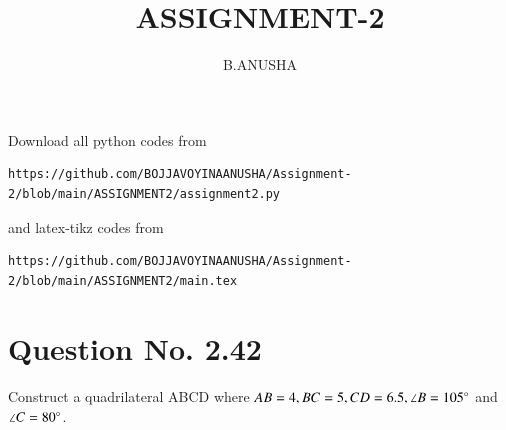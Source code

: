 \documentclass[journal,12pt,twocolumn]{IEEEtran}
\begin{document}
     \def\centbox#1{\makebox[0in]{#1}}
     \def\topbox#1{\raisebox{-\baselineskip}[0in][0in]{#1}}
     \def\midbox#1{\raisebox{-0.5\baselineskip}[0in][0in]{#1}}
\vspace{3cm}
\title{ASSIGNMENT-2}
\author{B.ANUSHA}
\maketitle
\newpage
\bigskip
\renewcommand{\thefigure}{\theenumi}
\renewcommand{\thetable}{\theenumi}
Download all python codes from 
\begin{lstlisting}
https://github.com/BOJJAVOYINAANUSHA/Assignment-2/blob/main/ASSIGNMENT2/assignment2.py
\end{lstlisting}
%
and latex-tikz codes from 
%
\begin{lstlisting}
https://github.com/BOJJAVOYINAANUSHA/Assignment-2/blob/main/ASSIGNMENT2/main.tex
\end{lstlisting}
%
\section{Question No. 2.42}
Construct a quadrilateral ABCD where $AB = 4, BC = 5, CD = 6.5, \angle B = 105 \degree$ and $\angle C = 80 \degree$.
%
\end{document}
